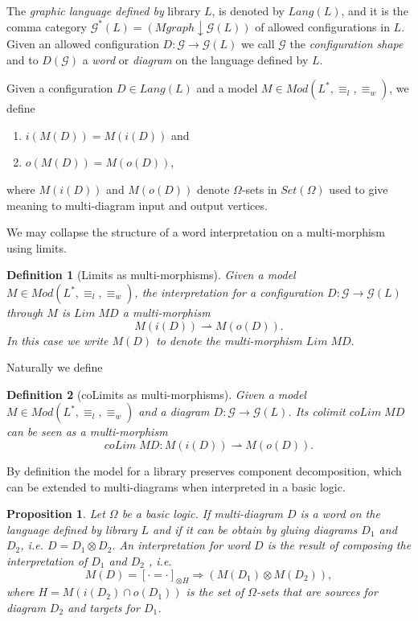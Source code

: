 \documentclass[oribibl]{llncs}
\newtheorem{prop}{Proposition}
\newtheorem{defn}{Definition}
\newcommand{\G}{\mathcal{G}}
\begin{document}
The \emph{graphic language defined by} library $L$, is denoted by $Lang(L)$,
and it is the comma category
$\G^\ast(L)=(Mgraph\downarrow \G(L))$ of allowed configurations in
$L$. Given an allowed configuration $D:\G\rightarrow \G(L)$ we call
 $\G$ the \emph{configuration shape} and  to $D(\G)$ a
\emph{word} or \emph{diagram} on the language defined by $L$.

Given a configuration $D\in Lang(L)$ and a model $M\in
Mod(L^\ast,\equiv_l,\equiv_w)$, we define
\begin{enumerate}
  \item $i(M(D))=M(i(D))$ and
  \item $o(M(D))=M(o(D))$,
\end{enumerate}
where $M(i(D))$ and $M(o(D))$ denote $\Omega$-sets in $Set(\Omega)$ used to give meaning to multi-diagram input and output vertices.

We may collapse the structure of a word interpretation on a multi-morphism using limits.

\begin{defn}[Limits as multi-morphisms]\label{def:word interpret}
Given a model $M\in Mod(L^\ast,\equiv_l,\equiv_w)$, the \emph{interpretation for a configuration}
$D:\G\rightarrow \G(L)$ through $M$ is  $Lim\;MD$ a multi-morphism
\[ M(i(D))\rightharpoonup M(o(D)).\]
In this case we write $M(D)$ to denote the multi-morphism $Lim\;MD$.
\end{defn}

Naturally we define

\begin{defn}[coLimits as multi-morphisms]\label{def:colim interpret}
Given a model $M\in Mod(L^\ast,\equiv_l,\equiv_w)$ and a diagram
$D:\G\rightarrow \G(L)$. Its colimit $coLim\;MD$ can be seen as a multi-morphism
\[coLim\;MD : M(i(D))\rightharpoonup M(o(D)).\]
\end{defn}

By definition the model for a library preserves component decomposition, which can be extended to multi-diagrams when interpreted in a basic logic.
\begin{prop}
Let $\Omega$ be a basic logic. If multi-diagram $D$ is a word on the language defined by library $L$ and if it can be obtain by gluing diagrams $D_1$ and $D_2$, i.e. $D=D_1\otimes D_2$. An interpretation for word $D$  is the result of composing the interpretation of $D_1$ and $D_2$ , i.e.
\[M(D)=[\cdot=\cdot]_{\otimes H}\Rightarrow (M(D_1)\otimes M(D_2)),\]
where $H=M(i(D_2)\cap o(D_1))$ is the set of $\Omega$-sets that are sources for diagram $D_2$ and targets for $D_1$.
\end{prop}
\end{document}

